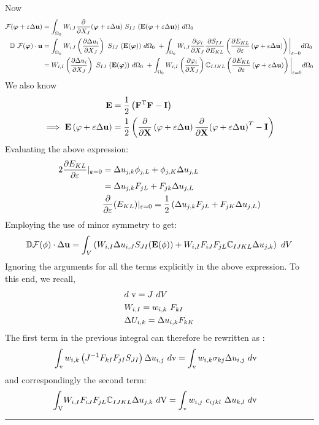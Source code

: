 Now
\begin{align*}
\mathcal{F}
(\bm\varphi + \varepsilon\Delta {\bf u})
& =
\int_{\Omega_0}
W_{i,I}
\del{}{X_J}
(\bm\varphi + \varepsilon\Delta {\bf u})\ S_{IJ}\ 
({\bf E}(\bm\varphi + \varepsilon\Delta {\bf u}))\ d\Omega_0 \\
\mathbb{D}\ 
\mathcal{F}({\bm\varphi})
\cdot{\bf u}
& =
\int_{\Omega_0}
W_{i,I}
\left(
\del{\Delta u_i}{X_J}\right)
\ S_{IJ}\ ({\bf E}({\bm\varphi}))\ d\Omega_0\  + 
\int_{\Omega_0}
W_{i,I}
\del{\varphi_i}{X_J}\del{S_{IJ}}{E_{KL}} \left( 
\del{E_{KL}}{\varepsilon}
\left(
\bm\varphi 
+
\varepsilon \Delta{\bf u}
\right)
\right)\bigg|_{\varepsilon = 0}d\Omega_0 \\
& = 
W_{i,I}
\left(
\del{\Delta u_i}{X_J}\right)
\ S_{IJ}\ ({\bf E}({\bm\varphi}))\ d\Omega_0\ +
\int_{\Omega_0}
W_{i,I}\left(
\del{\varphi_i}{X_J}\right) {\mathbb{C}}_{IJKL}\left( 
\del{E_{KL}}{\varepsilon}
\left(
\bm\varphi 
+
\varepsilon \Delta{\bf u}
\right)
\right)\bigg|_{\varepsilon = 0}d\Omega_0 
\end{align*}
We also know
\begin{align*}
{\bf E}
& =
\frac{1}{2}
\left(
{\bf F^{\rm T}_{}F^{\rm }_{} - I}
\right)\\
\implies 
{\bf E}
\left(
\varphi + \varepsilon\Delta{\bf u}
\right)
& =
\frac{1}{2}
\left(
\frac{\partial {}}{\partial {\bf X}}
\left(
\varphi + \varepsilon\Delta{\bf u}
\right)
\frac{\partial {}}{\partial {\bf X}}
{
\left(
\varphi + \varepsilon\Delta{\bf u}
\right)
}^T - {\bf I}
\right)
\end{align*}
Evaluating the above expression: 
\begin{align*}
2\frac{\partial {E_{KL}}}{\partial {\varepsilon}}|_{\bm\varepsilon = 0}
& =
\Delta u_{j,k} \phi_{j,L} + \phi_{j,K}\Delta u_{j,L} \\
& = 
\Delta u_{j,k}F_{jL}
+
F_{jk}\Delta u_{j,L} \\
& \frac{\partial {}}{\partial {\varepsilon}}
(E_{KL})|_{\varepsilon = 0}
=
\frac{1}{2}
\left(
\Delta u_{j,k}F_{jL} + F_{jK}\Delta u_{j,L}
\right)
\end{align*}
Employing the use of minor symmetry to get: 
\begin{align*}
\mathbb{D}\mathcal{F}(\phi)\cdot\Delta {\bf u}
=
\int_{V}
\left(
W_{i,I}\Delta u_{i,J}S_{JI} ({\bf E}(\phi)) + W_{i,I}F_{iJ}F_{jL}\mathbb{C}_{IJKL}\Delta u_{j,k}
\right)\ dV
\end{align*}
Ignoring the arguments for all the terms explicitly in the above expression. To this end, we recall, 
\begin{align*}
& d\ {\rm v} = J\ dV \\
& W_{i,I} = w_{i,k}\ F_{kI} \\
& \Delta U_{i,k}
=
\Delta
u_{i,k}F_{kK}
\end{align*}
The first term in the previous integral can therefore be rewritten as : 
\begin{align*}
& \int_{\rm v}
w_{i,k}
\left(
J^{-1}
F_{kI}
F_{jI}
S_{JI}
\right)
\Delta u_{i,j}\ d{\rm v} = \int_{\rm v} w_{i,k} \sigma_{kj}\Delta u_{i,j}\ d{\rm v}
\end{align*}
and correspondingly the second term: 
\begin{align*}
\int_{\rm V}
& W_{i,I}F_{iJ}F_{jL}\mathbb{C}_{IJKL}\Delta u_{j,k}\ d{\rm V} = \int_{\rm v}
w_{i,j}\ c_{ijkl}\ \Delta u_{k,l}\ d{\rm v}
\end{align*}\hrule
